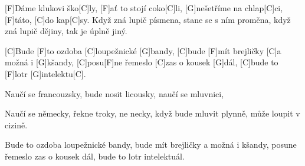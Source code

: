 
[F]Dáme klukovi ško[C]ly,
[F]ať to stojí coko[C]li,
[G]nešetříme na chlap[C]ci,
[F]táto, [C]do kap[C]sy.
Když zná lupič písmena,
stane se s ním proměna,
když zná lupič dějiny,
tak je úplně jiný.

[C]Bude [F]to ozdoba [C]loupežnické [G]bandy,
[C]bude [F]mít brejličky [C]a možná i [G]kšandy,
[C]posu[F]ne řemeslo [C]zas o kousek [G]dál,
[C]bude to [F]lotr [G]intelektu[C].

Naučí se francouzsky,
bude nosit licousky,
naučí se mluvnici,

Naučí se německy,
řekne troky, ne necky,
když bude mluvit plynně,
může loupit v cizině.

Bude to ozdoba loupežnické bandy,
bude mít brejličky a možná i kšandy,
posune řemeslo zas o kousek dál,
bude to lotr intelektuál.